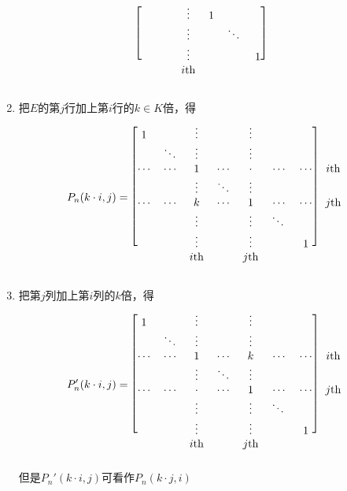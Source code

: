 \documentclass[11pt]{article}
\begin{document}
\begin{definition}[]
\begin{enumerate}
\begin{equation*}
\begin{blockarray}{cccccccc}
\begin{block}{[ccccccc]c}
&&&\vdots&1\\
&&&\vdots&&\ddots\\
&&&\vdots&&&1\\
\end{block}
 &&&i\text{th}&&&&\\
\end{blockarray}
\end{equation*}
\item 把\(E\)的第\(j\)行加上第\(i\)行的\(k\in K\)倍，得
\begin{equation*}
P_n(k\cdot i,j)=
\begin{blockarray}{cccccccc}
\begin{block}{[ccccccc]c}
1&&\vdots&&\vdots\\
&\ddots&\vdots&&\vdots\\
\cdots&\cdots&1&\cdots&\cdot&\cdots&\cdots&i\text{th}\\
&&\vdots&\ddots&\vdots\\
\cdots&\cdots&k&\cdots&1&\cdots&\cdots&j\text{th}\\
&&\vdots&&\vdots&\ddots\\
&&\vdots&&\vdots&&1\\
\end{block}
&&i\text{th}&&j\text{th}
\end{blockarray}
\end{equation*}
\item 把第\(j\)列加上第\(i\)列的\(k\)倍，得
\begin{equation*}
P_n'(k\cdot i,j)=
\begin{blockarray}{cccccccc}
\begin{block}{[ccccccc]c}
1&&\vdots&&\vdots\\
&\ddots&\vdots&&\vdots\\
\cdots&\cdots&1&\cdots&k&\cdots&\cdots&i\text{th}\\
&&\vdots&\ddots&\vdots\\
\cdots&\cdots&\cdot&\cdots&1&\cdots&\cdots&j\text{th}\\
&&\vdots&&\vdots&\ddots\\
&&\vdots&&\vdots&&1\\
\end{block}
&&i\text{th}&&j\text{th}
\end{blockarray}
\end{equation*}
但是\(P_n'(k\cdot i,j)\)可看作\(P_n(k\cdot j,i)\)
\end{enumerate}
\end{definition}
\end{document}
